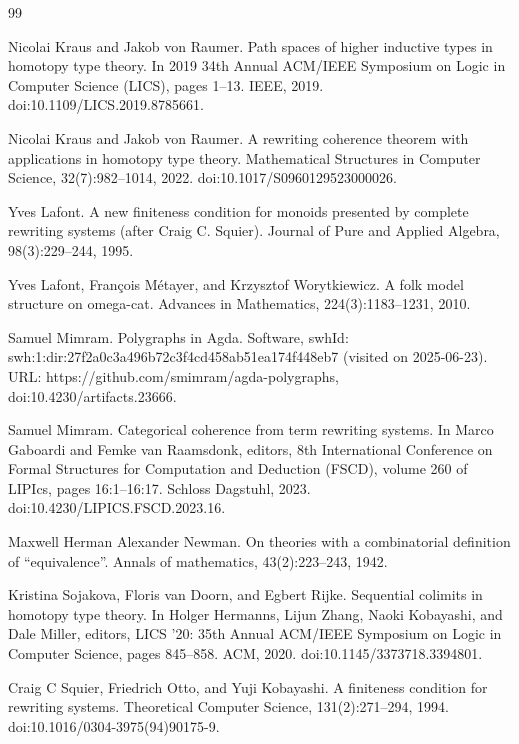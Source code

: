 \documentclass[10pt,a4paper]{amsart}
\begin{document}
\begin{thebibliography}{99}
\par\noindent  [9]  Nicolai Kraus and Jakob von Raumer.  Path spaces of higher inductive types in homotopy type theory.  In 2019 34th Annual ACM/IEEE Symposium on Logic in Computer Science (LICS), pages 1–13. IEEE, 2019.  doi:10.1109/LICS.2019.8785661.  
 
\par\noindent  [10]  Nicolai Kraus and Jakob von Raumer.  A rewriting coherence theorem with applications in homotopy type theory.  Mathematical Structures in Computer Science, 32(7):982–1014, 2022.  doi:10.1017/S0960129523000026.  
 
\par\noindent  [11]  Yves Lafont.  A new finiteness condition for monoids presented by complete rewriting systems (after Craig C. Squier).  Journal of Pure and Applied Algebra, 98(3):229–244, 1995.  
 
\par\noindent  [12]  Yves Lafont, François Métayer, and Krzysztof Worytkiewicz.  A folk model structure on omega-cat.  Advances in Mathematics, 224(3):1183–1231, 2010.  
 
\par\noindent  [13]  Samuel Mimram.  Polygraphs in Agda.  Software, swhId: swh:1:dir:27f2a0c3a496b72c3f4cd458ab51ea174f448eb7 (visited on 2025-06-23).  URL: https://github.com/smimram/agda-polygraphs, doi:10.4230/artifacts.23666.  
 
\par\noindent  [14]  Samuel Mimram.  Categorical coherence from term rewriting systems.  In Marco Gaboardi and Femke van Raamsdonk, editors, 8th International Conference on Formal Structures for Computation and Deduction (FSCD), volume 260 of LIPIcs, pages 16:1–16:17. Schloss Dagstuhl, 2023.  doi:10.4230/LIPICS.FSCD.2023.16.  
 
\par\noindent  [15]  Maxwell Herman Alexander Newman.  On theories with a combinatorial definition of “equivalence”.  Annals of mathematics, 43(2):223–243, 1942.  
 
\par\noindent  [16]  Kristina Sojakova, Floris van Doorn, and Egbert Rijke.  Sequential colimits in homotopy type theory.  In Holger Hermanns, Lijun Zhang, Naoki Kobayashi, and Dale Miller, editors, LICS ’20: 35th Annual ACM/IEEE Symposium on Logic in Computer Science, pages 845–858. ACM, 2020.  doi:10.1145/3373718.3394801.  
 
\par\noindent  [17]  Craig C Squier, Friedrich Otto, and Yuji Kobayashi.  A finiteness condition for rewriting systems.  Theoretical Computer Science, 131(2):271–294, 1994.  doi:10.1016/0304-3975(94)90175-9.  
 

\end{thebibliography}
\end{document}
